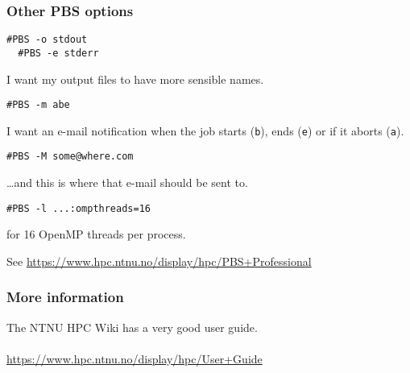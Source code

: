 \begin{frame}[fragile]
  \frametitle{Other PBS options}
\begin{lstlisting}[style=shell]
  #PBS -o stdout
  #PBS -e stderr
\end{lstlisting}
I want my output files to have more sensible names.
\begin{lstlisting}[style=shell]
  #PBS -m abe
\end{lstlisting}
I want an e-mail notification when the job starts (\texttt{b}), ends
(\texttt{e}) or if it aborts (\texttt{a}).
\begin{lstlisting}[style=shell]
  #PBS -M some@where.com
\end{lstlisting}
\ldots and this is where that e-mail should be sent to.
\begin{lstlisting}[style=shell]
  #PBS -l ...:ompthreads=16
\end{lstlisting}
for 16 OpenMP threads per process.

\medskip
See \url{https://www.hpc.ntnu.no/display/hpc/PBS+Professional}
\end{frame}

\begin{frame}
  \frametitle{More information}
  \begin{center}
    The NTNU HPC Wiki has a very good user guide. \\~\\
    \url{https://www.hpc.ntnu.no/display/hpc/User+Guide}
  \end{center}
\end{frame}


